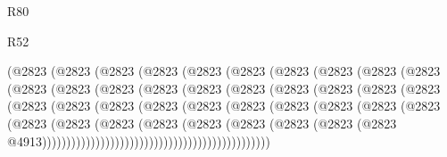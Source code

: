 \begin{lexlean}{R80}
\begin{lexlean}{R52}
\begin{coremodule}
{{{{{{{{{{{{{{{{{{{{{{{{{{{{{{{{{{{{{{{{{{{{{{{{{{{{{{{{{{{{{{{{{{{{{{{{{{{{{{{{{{{{{{{{{{{{{{{{{{{{{{{{{{{{{{{{{{{{{{{{{{{{{{{{{{{{{{{{{{{{{{{{{{{{{{{{{{{{{{{{{{{{{{{{{{{{{{{{{{{{{{{{{{{{{{{{{{{{{{                    (@2823
                      (@2823
                        (@2823
                          (@2823
                            (@2823
                              (@2823
                                (@2823
                                  (@2823
                                    (@2823
                                      (@2823
                                        (@2823
                                          (@2823
                                            (@2823
                                              (@2823
                                                (@2823
                                                  (@2823
                                                    (@2823
                                                      (@2823
                                                        (@2823
                                                          (@2823
                                                            (@2823
                                                              (@2823
                                                                (@2823
                                                                  (@2823
                                                                    (@2823
                                                                      (@2823
                                                                        (@2823
                                                                          (@2823
                                                                            (@2823
                                                                              (@2823
                                                                                (@2823
                                                                                  (@2823
                                                                                    (@2823
                                                                                      (@2823
                                                                                        (@2823
                                                                                          (@2823
                                                                                            (@2823
                                                                                              (@2823
                                                                                                (@2823
                                                                                                  @4913)))))))))))))))))))))))))))))))))))))))))))))))
}}}}}}}}}}}}}}}}}}}}}}}}}}}}}}}}}}}}}}}}}}}}}}}}}}}}}}}}}}}}}}}}}}}}}}}}}}}}}}}}}}}}}}}}}}}}}}}}}}}}}}}}}}}}}}}}}}}}}}}}}}}}}}}}}}}}}}}}}}}}}}}}}}}}}}}}}}}}}}}}}}}}}}}}}}}}}}}}}}}}}}}}}}}}}}}}}}}}}}
\end{coremodule}
\end{lexlean}
\end{lexlean}
